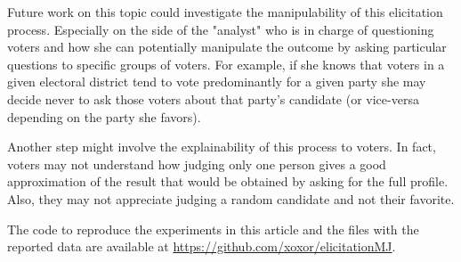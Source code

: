 		Future work on this topic could investigate the manipulability of this elicitation process. Especially on the side of the "analyst" who is in charge of questioning voters and how she can potentially manipulate the outcome by asking particular questions to specific groups of voters. For example, if she knows that voters in a given electoral district tend to vote predominantly for a given party she may decide never to ask those voters about that party's candidate (or vice-versa depending on the party she favors). 
		
		Another step might involve the explainability of this process to voters. In fact, voters may not understand how judging only one person gives a good approximation of the result that would be obtained by asking for the full profile. Also, they may not appreciate judging a random candidate and not their favorite.
		
		The code to reproduce the experiments in this article and the files with the reported data are available at \url{https://github.com/xoxor/elicitationMJ}.
	